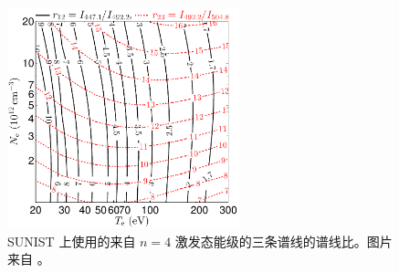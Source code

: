 \begin{figure}[H]
  \centering
  \includegraphics[width=0.6\textwidth]{1-9to7-7to5-getTeNe-lineratio.pdf}
  \caption{SUNIST 上使用的来自 $n=4$ 激发态能级的三条谱线的谱线比。图片来自 。}
  \label{fig:chap03:getTeNe-lineratio}
\end{figure}

